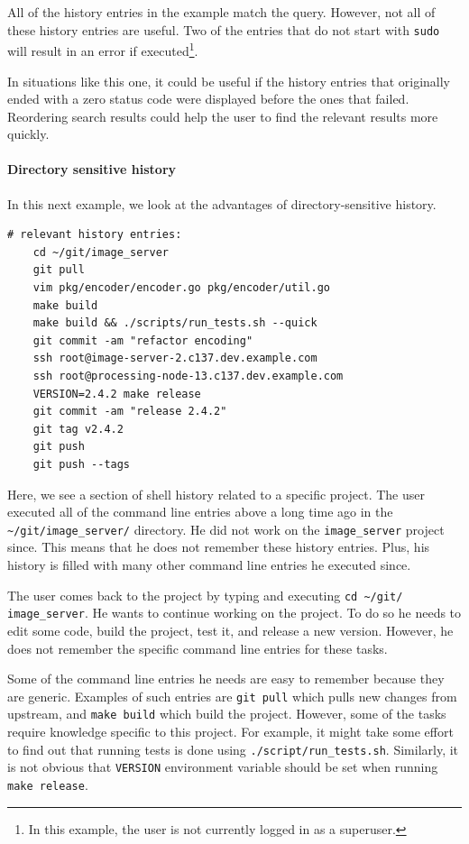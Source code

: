 All of the history entries in the example match the query. However, not all of these history entries are useful. Two of the entries that do not start with \verb|sudo| will result in an error if executed\footnote{In this example, the user is not currently logged in as a superuser.}. 

In situations like this one, it could be useful if the history entries that originally ended with a zero status code were displayed before the ones that failed. Reordering search results could help the user to find the relevant results more quickly. 

\paragraph{Directory sensitive history}

In this next example, we look at the advantages of directory-sensitive history.

\begin{verbatim}
# relevant history entries:
    cd ~/git/image_server
    git pull
    vim pkg/encoder/encoder.go pkg/encoder/util.go
    make build
    make build && ./scripts/run_tests.sh --quick
    git commit -am "refactor encoding"
    ssh root@image-server-2.c137.dev.example.com
    ssh root@processing-node-13.c137.dev.example.com
    VERSION=2.4.2 make release
    git commit -am "release 2.4.2"
    git tag v2.4.2
    git push
    git push --tags
\end{verbatim}

Here, we see a section of shell history related to a specific project. The user executed all of the command line entries above a long time ago in the \verb|~/git/image_server/| directory. He did not work on the \verb|image_server| project since. This means that he does not remember these history entries. Plus, his history is filled with many other command line entries he executed since.

The user comes back to the project by typing and executing \verb|cd ~/git/| \verb|image_server|. He wants to continue working on the project. To do so he needs to edit some code, build the project, test it, and release a new version. However, he does not remember the specific command line entries for these tasks. 

Some of the command line entries he needs are easy to remember because they are generic. Examples of such entries are \verb|git pull| which pulls new changes from upstream, and \verb|make build| which build the project. However, some of the tasks require knowledge specific to this project. For example, it might take some effort to find out that running tests is done using \verb|./script/run_tests.sh|. Similarly, it is not obvious that \verb|VERSION| environment variable should be set when running \verb|make release|.

